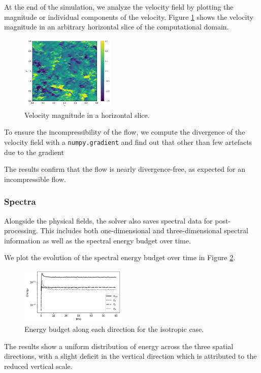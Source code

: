 \documentclass[final,5p,times,twocolumn,authoryear]{elsarticle}
\begin{document}
At the end of the simulation, we analyze the velocity field by plotting the magnitude or individual components of the velocity. Figure \ref{fig:iso slice} shows the velocity magnitude in an arbitrary horizontal slice of the computational domain.
\begin{figure}[h]
\centering
\includegraphics[width=0.4\textwidth]{fig/iso_slice.png}
\caption{Velocity magnitude in a horizontal slice.}
\label{fig:iso slice}
\end{figure}

To ensure the incompressibility of the flow, we compute the divergence of the velocity field with a \texttt{numpy.gradient} and find out that other than few artefacts due to the gradient 

The results confirm that the flow is nearly divergence-free, as expected for an incompressible flow.

\subsubsection{Spectra}
Alongside the physical fields, the solver also saves spectral data for post-processing. This includes both one-dimensional and three-dimensional spectral information as well as the spectral energy budget over time.

We plot the evolution of the spectral energy budget over time in Figure \ref{fig:iso budget}. 
\begin{figure}[h]
	\centering
	\includegraphics[width=0.45\textwidth]{fig/iso_budget.png}
	\caption{Energy budget along each direction for the isotropic case.} 
	\label{fig:iso budget}
\end{figure}

The results show a uniform distribution of energy across the three spatial directions, with a slight deficit in the vertical direction which is attributed to the reduced vertical scale.
\end{document}
